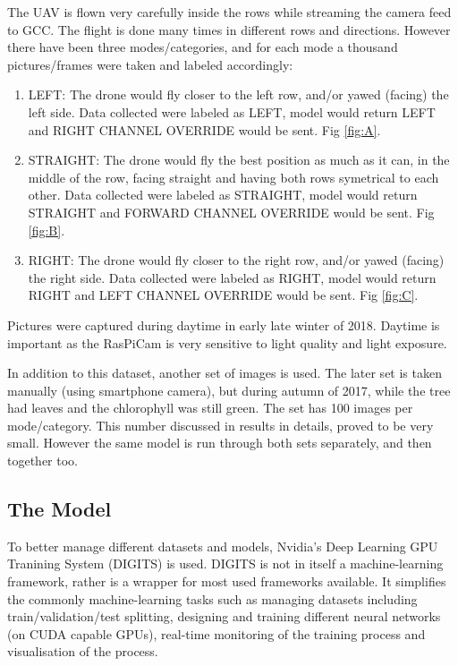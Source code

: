 \documentclass[10pt,jaurnal,compsoc]{IEEEtran}
\begin{document}
The UAV is flown very carefully inside the rows while streaming the camera feed to GCC. The flight is done many times in different rows and directions. However there have been three modes/categories, and for each mode a thousand pictures/frames were taken and labeled accordingly:
\begin{enumerate}
    \item LEFT: The drone would fly closer to the left row, and/or yawed (facing) the left side. Data collected were labeled as LEFT, model would return LEFT and RIGHT CHANNEL OVERRIDE would be sent. Fig \ref{fig:A}.
    \item STRAIGHT: The drone would fly the best position as much as it can, in the middle of the row, facing straight and having both rows symetrical to each other. Data collected were labeled as STRAIGHT, model would return STRAIGHT and FORWARD CHANNEL OVERRIDE would be sent. Fig \ref{fig:B}.
    \item RIGHT: The drone would fly closer to the right row, and/or yawed (facing) the right side. Data collected were labeled as RIGHT, model would return RIGHT and LEFT CHANNEL OVERRIDE would be sent. Fig \ref{fig:C}.
\end{enumerate}
Pictures were captured during daytime in early late winter of 2018. Daytime is important as the RasPiCam is very sensitive to light quality and light exposure.

In addition to this dataset, another set of images is used. The later set is taken manually (using smartphone camera), but during autumn of 2017, while the tree had leaves and the chlorophyll was still green. The set has 100 images per mode/category. This number discussed in results in details, proved to be very small. However the same model is run through both sets separately, and then together too.
\subsection{The Model}
To better manage different datasets and models, Nvidia's Deep Learning GPU Tranining System (DIGITS) is used. DIGITS is not in itself a machine-learning framework, rather is a wrapper for most used frameworks available. It simplifies the commonly machine-learning tasks such as managing datasets including train/validation/test splitting, designing and training different neural networks (on CUDA capable GPUs), real-time monitoring of the training process and visualisation of the process.
\end{document}
